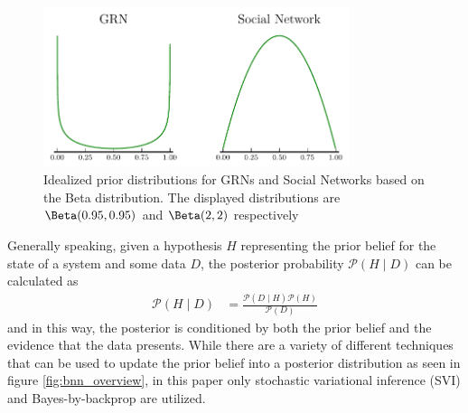 \begin{figure}[t]
  \centering
  \includegraphics[width=0.8\textwidth]{images/prior.pdf}
  \caption{Idealized prior distributions for GRNs and Social Networks based on the Beta distribution. The displayed distributions are $\Beta(0.95, 0.95)$ and $\Beta(2, 2)$ respectively}
  \label{fig:prior}
\end{figure}
Generally speaking, given a hypothesis $H$ representing the prior belief for the state of a system and some data $D$, the posterior probability $\mathcal{P}(H\mid D)$ can be calculated as
\begin{align*}
  \mathcal{P}(H\mid D) &= \frac{\mathcal{P}(D\mid H)\mathcal{P}(H)}{\mathcal{P}(D)}
\end{align*}
and in this way, the posterior is conditioned by both the prior belief and the evidence that the data presents. While there are a variety of different techniques that can be used to update the prior belief into a posterior distribution as seen in figure \ref{fig:bnn_overview}, in this paper only stochastic variational inference (SVI) and Bayes-by-backprop are utilized. 


